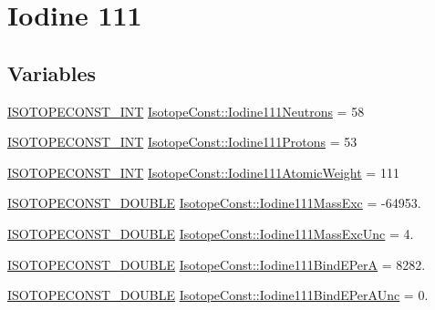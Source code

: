 \hypertarget{group___isotope_const-_iodine-_i111}{}\section{Iodine 111}
\label{group___isotope_const-_iodine-_i111}
\subsection*{Variables}
\begin{DoxyCompactItemize}
\item 
\mbox{\hyperlink{group___isotope_const-_macros_ga5f18360b3e99483a35c32d789e62621c}{I\+S\+O\+T\+O\+P\+E\+C\+O\+N\+S\+T\+\_\+\+I\+NT}} \mbox{\hyperlink{group___isotope_const-_iodine-_i111_ga06235793db98986bb9f261fc5f0eff0b}{Isotope\+Const\+::\+Iodine111\+Neutrons}} = 58
\item 
\mbox{\hyperlink{group___isotope_const-_macros_ga5f18360b3e99483a35c32d789e62621c}{I\+S\+O\+T\+O\+P\+E\+C\+O\+N\+S\+T\+\_\+\+I\+NT}} \mbox{\hyperlink{group___isotope_const-_iodine-_i111_ga59831d0cf94b10ea1b5d089314b27fe5}{Isotope\+Const\+::\+Iodine111\+Protons}} = 53
\item 
\mbox{\hyperlink{group___isotope_const-_macros_ga5f18360b3e99483a35c32d789e62621c}{I\+S\+O\+T\+O\+P\+E\+C\+O\+N\+S\+T\+\_\+\+I\+NT}} \mbox{\hyperlink{group___isotope_const-_iodine-_i111_ga79565466823ae717b4989b9b8d4b1c39}{Isotope\+Const\+::\+Iodine111\+Atomic\+Weight}} = 111
\item 
\mbox{\hyperlink{group___isotope_const-_macros_ga8f45a7272ce02c0b4c65c44636ed719a}{I\+S\+O\+T\+O\+P\+E\+C\+O\+N\+S\+T\+\_\+\+D\+O\+U\+B\+LE}} \mbox{\hyperlink{group___isotope_const-_iodine-_i111_gaafc2df74e613ae08c16cbec01c798fef}{Isotope\+Const\+::\+Iodine111\+Mass\+Exc}} = -\/64953.
\item 
\mbox{\hyperlink{group___isotope_const-_macros_ga8f45a7272ce02c0b4c65c44636ed719a}{I\+S\+O\+T\+O\+P\+E\+C\+O\+N\+S\+T\+\_\+\+D\+O\+U\+B\+LE}} \mbox{\hyperlink{group___isotope_const-_iodine-_i111_ga10bb3e98aea04aaabfecd1376b3f3a70}{Isotope\+Const\+::\+Iodine111\+Mass\+Exc\+Unc}} = 4.
\item 
\mbox{\hyperlink{group___isotope_const-_macros_ga8f45a7272ce02c0b4c65c44636ed719a}{I\+S\+O\+T\+O\+P\+E\+C\+O\+N\+S\+T\+\_\+\+D\+O\+U\+B\+LE}} \mbox{\hyperlink{group___isotope_const-_iodine-_i111_ga1baef929d87902c616b6ba2cb0f7a67a}{Isotope\+Const\+::\+Iodine111\+Bind\+E\+PerA}} = 8282.
\item 
\mbox{\hyperlink{group___isotope_const-_macros_ga8f45a7272ce02c0b4c65c44636ed719a}{I\+S\+O\+T\+O\+P\+E\+C\+O\+N\+S\+T\+\_\+\+D\+O\+U\+B\+LE}} \mbox{\hyperlink{group___isotope_const-_iodine-_i111_ga82af59e028a10427a3b34436476292d9}{Isotope\+Const\+::\+Iodine111\+Bind\+E\+Per\+A\+Unc}} = 0.

\end{DoxyCompactItemize}
